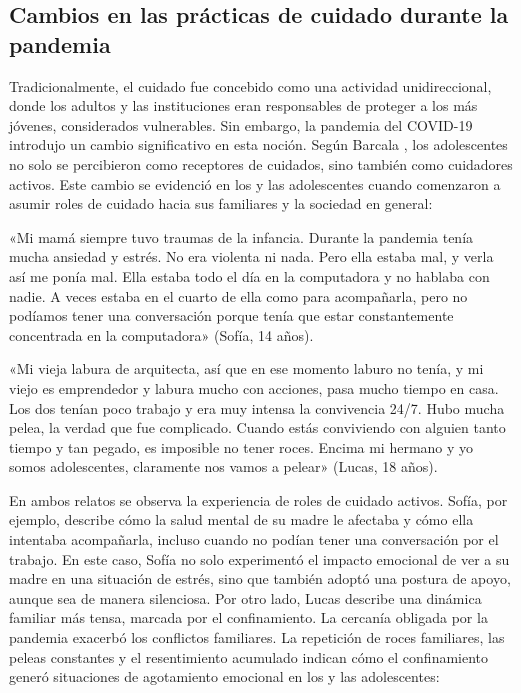 \begin{refsection}
\section[Cambios en las prácticas de cuidado durante la pandemia]{Cambios en las prácticas de cuidado durante la pandemia}
\label{cap-26.cambios-en-las-practicas-de-cuidado-durante-la-pandemia}
Tradicionalmente, el cuidado fue concebido como una actividad unidireccional, donde los adultos y las instituciones eran responsables de proteger a los más jóvenes, considerados vulnerables. Sin embargo, la pandemia del COVID-19 introdujo un cambio significativo en esta noción. Según Barcala \protect\parencite*{4274-BARCALA2022}, los adolescentes no solo se percibieron como receptores de cuidados, sino también como cuidadores activos. Este cambio se evidenció en los y las adolescentes cuando comenzaron a asumir roles de cuidado hacia sus familiares y la sociedad en general:


\begin{gbcita}
«Mi mamá siempre tuvo traumas de la infancia. Durante la pandemia tenía mucha ansiedad y estrés. No era violenta ni nada. Pero ella estaba mal, y verla así me ponía mal. Ella estaba todo el día en la computadora y no hablaba con nadie. A veces estaba en el cuarto de ella como para acompañarla, pero no podíamos tener una conversación porque tenía que estar constantemente concentrada en la computadora» (Sofía, 14 años).

«Mi vieja labura de arquitecta, así que en ese momento laburo no tenía, y mi viejo es emprendedor y labura mucho con acciones, pasa mucho tiempo en casa. Los dos tenían poco trabajo y era muy intensa la convivencia 24/7. Hubo mucha pelea, la verdad que fue complicado. Cuando estás conviviendo con alguien tanto tiempo y tan pegado, es imposible no tener roces. Encima mi hermano y yo somos adolescentes, claramente nos vamos a pelear» (Lucas, 18 años).

\end{gbcita}

En ambos relatos se observa la experiencia de roles de cuidado activos. Sofía, por ejemplo, describe cómo la salud mental de su madre le afectaba y cómo ella intentaba acompañarla, incluso cuando no podían tener una conversación por el trabajo. En este caso, Sofía no solo experimentó el impacto emocional de ver a su madre en una situación de estrés, sino que también adoptó una postura de apoyo, aunque sea de manera silenciosa. Por otro lado, Lucas describe una dinámica familiar más tensa, marcada por el confinamiento. La cercanía obligada por la pandemia exacerbó los conflictos familiares. La repetición de roces familiares, las peleas constantes y el resentimiento acumulado indican cómo el confinamiento generó situaciones de agotamiento emocional en los y las adolescentes:



\end{refsection}
